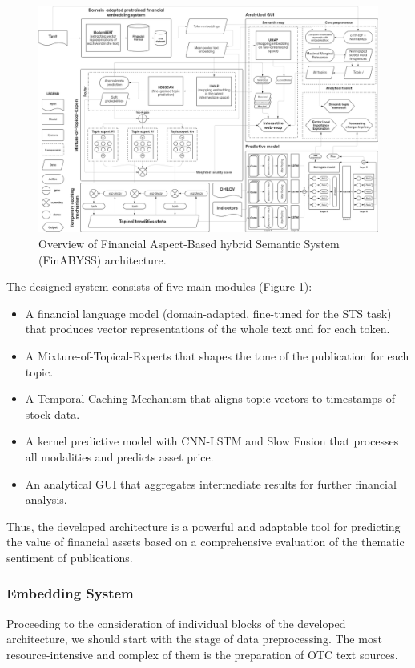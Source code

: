 \begin{figure}[H]
    \centering
    \includegraphics[width=1\linewidth]{img/architecture_overview.png}
    \caption{Overview of Financial Aspect-Based hybrid Semantic System (FinABYSS) architecture.}
    \label{fig:architecture_overview}
\end{figure}

The designed system consists of five main modules (Figure \ref{fig:architecture_overview}):

\begin{itemize}
    \item A financial language model (domain-adapted, fine-tuned for the STS task) that produces vector representations
    of the whole text and for each token.
    \item A Mixture-of-Topical-Experts that shapes the tone of the publication for each topic.
    \item A Temporal Caching Mechanism that aligns topic vectors to timestamps of stock data.
    \item A kernel predictive model with CNN-LSTM and Slow Fusion that processes all modalities and predicts asset price.
    \item An analytical GUI that aggregates intermediate results for further financial analysis.
\end{itemize}

Thus, the developed architecture is a powerful and adaptable tool for predicting the value of financial assets
based on a comprehensive evaluation of the thematic sentiment of publications.

\subsubsection{Embedding System}
Proceeding to the consideration of individual blocks of the developed architecture, we should start with the stage
of data preprocessing. The most resource-intensive and complex of them is the preparation of OTC text sources.

